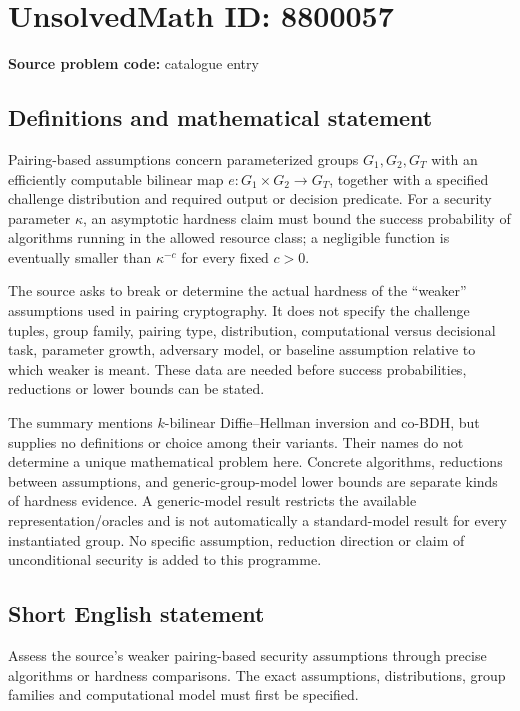 \documentclass[11pt]{article}
\begin{document}
\section*{UnsolvedMath ID: 8800057}
\textbf{Source problem code:} catalogue entry
\subsection{Definitions and mathematical statement}
Pairing-based assumptions concern parameterized groups $G_1,G_2,G_T$ with an efficiently computable bilinear map $e:G_1\times G_2\to G_T$, together with a specified challenge distribution and required output or decision predicate. For a security parameter $\kappa$, an asymptotic hardness claim must bound the success probability of algorithms running in the allowed resource class; a negligible function is eventually smaller than $\kappa^{-c}$ for every fixed $c>0$.

The source asks to break or determine the actual hardness of the ``weaker'' assumptions used in pairing cryptography. It does not specify the challenge tuples, group family, pairing type, distribution, computational versus decisional task, parameter growth, adversary model, or baseline assumption relative to which weaker is meant. These data are needed before success probabilities, reductions or lower bounds can be stated.

The summary mentions $k$-bilinear Diffie--Hellman inversion and co-BDH, but supplies no definitions or choice among their variants. Their names do not determine a unique mathematical problem here. Concrete algorithms, reductions between assumptions, and generic-group-model lower bounds are separate kinds of hardness evidence. A generic-model result restricts the available representation/oracles and is not automatically a standard-model result for every instantiated group. No specific assumption, reduction direction or claim of unconditional security is added to this programme.
\subsection{Short English statement}
Assess the source's weaker pairing-based security assumptions through precise algorithms or hardness comparisons. The exact assumptions, distributions, group families and computational model must first be specified.
\end{document}
